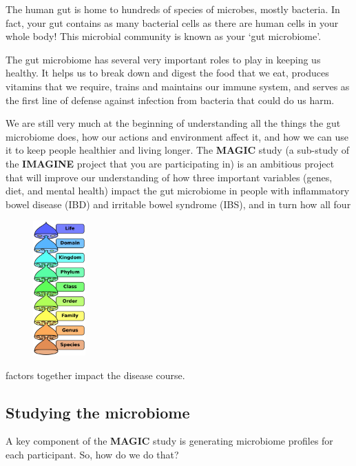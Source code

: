 \documentclass[
]{article}
\begin{document}
The human gut is home to hundreds of species of microbes, mostly
bacteria. In fact, your gut contains as many bacterial cells as there
are human cells in your whole body! This microbial community is known as
your `gut microbiome'.

The gut microbiome has several very important roles to play in keeping
us healthy. It helps us to break down and digest the food that we eat,
produces vitamins that we require, trains and maintains our immune
system, and serves as the first line of defense against infection from
bacteria that could do us harm.

We are still very much at the beginning of understanding all the things
the gut microbiome does, how our actions and environment affect it, and
how we can use it to keep people healthier and living longer. The
\textbf{\color{Cerulean}MAGIC} study (a sub-study of the
\textbf{\color{RedOrange}IMAGINE} project that you are participating in)
is an ambitious project that will improve our understanding of how three
important variables (genes, diet, and mental health) impact the gut
microbiome in people with inflammatory bowel disease (IBD) and irritable
bowel syndrome (IBS), and in turn how all four

\begin{figure}
\includegraphics[width=0.18\textwidth]{img/Biological_classification_L_Pengo_vflip.png}
\end{figure}

factors together impact the disease course.

\subsection{Studying the microbiome}

A key component of the \textbf{\color{Cerulean}MAGIC} study is
generating microbiome profiles for each participant. So, how do we do
that?
\end{document}
